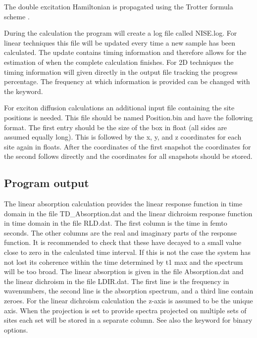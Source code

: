 The double excitation Hamiltonian is propagated using the Trotter formula
scheme \cite{Paarmann.2008.JCP.128.191103,Jansen.2010.JCP.132.224503}.

During the calculation the program will create a log file called NISE.log. For linear
techniques this file will be updated every time a new sample has been calculated.
The update contains timing information and therefore allows for the estimation of
when the complete calculation finishes. For 2D techniques the timing information will
given directly in the output file tracking the progress percentage. The frequency
at which information is provided can be changed with the  keyword.

For exciton diffusion calculations an additional input file containing the site
positions is needed. This file should be named Position.bin and have the following
format. The first entry should be the size of the box in float (all sides are assumed
equally long). This is followed by the x, y, and z coordinates for each site again
in floats. After the coordinates of the first snapshot the coordinates for the second
follows directly and the coordinates for all snapshots should be stored.


\subsection{Program output}
The linear absorption calculation provides the linear response function in time domain
in the file TD\_Absorption.dat and the linear dichroism response function in time
domain in the file RLD.dat. The first column is the time in femto seconds.
The other columns are the real and imaginary parts of the response function. It is
recommended to check that these have decayed to a small value close to zero in the
calculated time interval. If this is not the case the system has not lost its coherence
within the time determined by t1 max and the spectrum will be too broad. The linear
absorption is given in the file Absorption.dat and the linear dichroism in the file
LDIR.dat. The first line is the frequency in wavenumbers, the second line is the 
absorption spectrum, and a third line contain zeroes. For the linear dichroism
calculation the z-axis is assumed to be the unique axis. When the projection is set
to provide spectra projected on multiple sets of sites each set will be stored in
a separate column. See also the  keyword for binary options.


